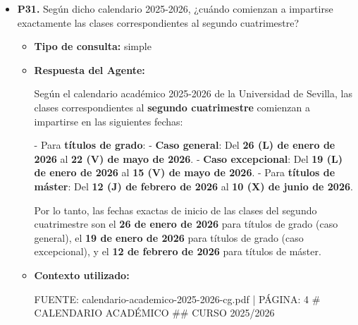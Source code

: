 \documentclass{article}
\begin{document}
\begin{itemize}
\begin{itemize}
                Lo siento, pero no puedo proporcionarte información sobre las fechas de las vacaciones escolares de Navidad según el calendario 2025-2026. Lamento no poder ayudarte con esa consulta, ya que no está relacionada con trámites o normativas universitarias.

                Te recomendaría contactar con el departamento de educación o con la administración de tu centro educativo para obtener la información más actualizada sobre las fechas de las vacaciones escolares. También podrías consultar el calendario oficial de vacaciones de la Junta de Andalucía o el Ministerio de Educación y Formación Profesional para obtener más información.
        \end{itemize}


  \item \textbf{P31.} Según dicho calendario 2025-2026, ¿cuándo comienzan a impartirse exactamente las clases correspondientes al segundo cuatrimestre? \\
        \begin{itemize}
          \item \textbf{Tipo de consulta:} simple
          \item \textbf{Respuesta del Agente:}

                Según el calendario académico 2025-2026 de la Universidad de Sevilla, las clases correspondientes al \textbf{segundo cuatrimestre} comienzan a impartirse en las siguientes fechas:

                - Para \textbf{títulos de grado}:
                - \textbf{Caso general}: Del \textbf{26 (L) de enero de 2026} al \textbf{22 (V) de mayo de 2026}.
                - \textbf{Caso excepcional}: Del \textbf{19 (L) de enero de 2026} al \textbf{15 (V) de mayo de 2026}.
                - Para \textbf{títulos de máster}: Del \textbf{12 (J) de febrero de 2026} al \textbf{10 (X) de junio de 2026}.

                Por lo tanto, las fechas exactas de inicio de las clases del segundo cuatrimestre son el \textbf{26 de enero de 2026} para títulos de grado (caso general), el \textbf{19 de enero de 2026} para títulos de grado (caso excepcional), y el \textbf{12 de febrero de 2026} para títulos de máster.
          \item \textbf{Contexto utilizado:}
                \begin{scriptsize}
                  FUENTE: calendario-academico-2025-2026-cg.pdf | PÁGINA: 4
                  \# CALENDARIO ACADÉMICO
                  \#\# CURSO 2025/2026


\end{scriptsize}
\end{itemize}
\end{itemize}
\end{document}
